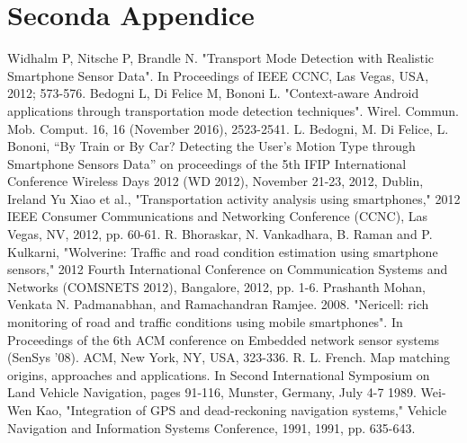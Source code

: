 \documentclass[12pt,a4paper,openright,twoside]{report}
\begin{document}
\chapter{Seconda Appendice}             %
\begin{thebibliography}{90}             %
\rhead[\fancyplain{}{\bfseries \leftmark}]{\fancyplain{}{\bfseries
\thepage}}
 Widhalm P, Nitsche P, Brandle N. "Transport Mode Detection with Realistic Smartphone Sensor Data". In Proceedings of IEEE CCNC, Las Vegas, USA, 2012; 573-576.
 Bedogni L, Di Felice M, Bononi L. "Context-aware Android applications through transportation mode detection techniques". Wirel. Commun. Mob. Comput. 16, 16 (November 2016), 2523-2541.
 L. Bedogni, M. Di Felice, L. Bononi, “By Train or By Car? Detecting the User’s Motion Type through Smartphone Sensors Data” on proceedings of the 5th IFIP International Conference Wireless Days 2012 (WD 2012), November 21-23, 2012, Dublin, Ireland
 Yu Xiao et al., "Transportation activity analysis using smartphones," 2012 IEEE Consumer Communications and Networking Conference (CCNC), Las Vegas, NV, 2012, pp. 60-61.
 R. Bhoraskar, N. Vankadhara, B. Raman and P. Kulkarni, "Wolverine: Traffic and road condition estimation using smartphone sensors," 2012 Fourth International Conference on Communication Systems and Networks (COMSNETS 2012), Bangalore, 2012, pp. 1-6.
 Prashanth Mohan, Venkata N. Padmanabhan, and Ramachandran Ramjee. 2008. "Nericell: rich monitoring of road and traffic conditions using mobile smartphones". In Proceedings of the 6th ACM conference on Embedded network sensor systems (SenSys '08). ACM, New York, NY, USA, 323-336.
 R. L. French. Map matching origins, approaches and applications. In Second International Symposium on Land Vehicle Navigation, pages 91-116,
Munster, Germany, July 4-7 1989.
 Wei-Wen Kao, "Integration of GPS and dead-reckoning navigation systems," Vehicle Navigation and Information Systems Conference, 1991, 1991, pp. 635-643.

\end{thebibliography}
\end{document}
